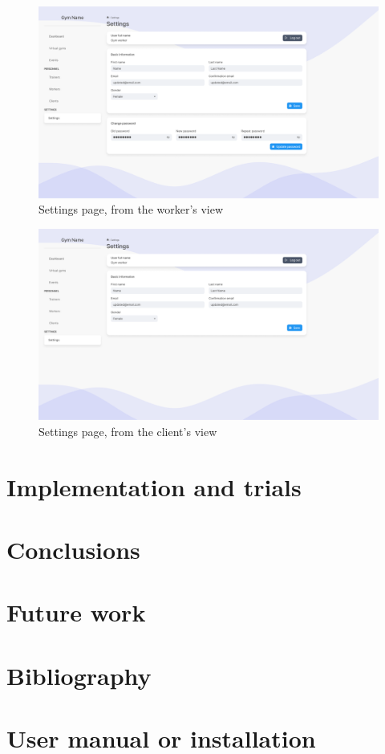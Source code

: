 \documentclass[a4paper, 12pt, oneside]{book}
\begin{document}
\begin{figure}[h!]
	\centering
	\includegraphics[width=\textwidth]{assets/ui/Worker.png}
	\caption{Settings page, from the worker's view}
\end{figure}
\begin{figure}[h!]
	\centering
	\includegraphics[width=\textwidth]{assets/ui/Client.png}
	\caption{Settings page, from the client's view}
\end{figure}
\chapter{Implementation and trials}
\chapter{Conclusions}
\chapter{Future work}
\appendix
\chapter{Bibliography}
\chapter{User manual or installation}
\end{document}
